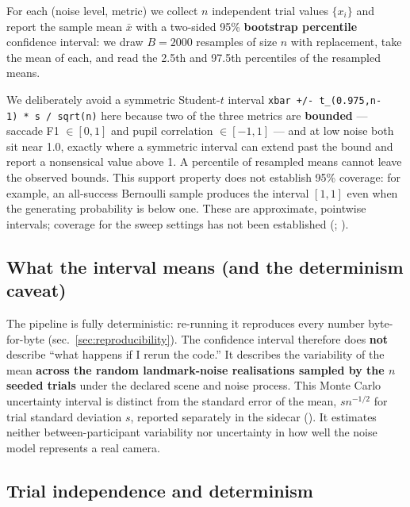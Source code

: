 \documentclass[
]{article}
\begin{document}
For each (noise level, metric) we collect \(n\) independent trial values
\(\{x_i\}\) and report the sample mean \(\bar{x}\) with a two-sided 95\%
\textbf{bootstrap percentile} confidence interval: we draw \(B = 2000\)
resamples of size \(n\) with replacement, take the mean of each, and
read the 2.5th and 97.5th percentiles of the resampled means.

We deliberately avoid a symmetric Student-\(t\) interval
\texttt{xbar\ +/-\ t\_(0.975,n-1)\ *\ s\ /\ sqrt(n)} here because two of
the three metrics are \textbf{bounded} --- saccade F1 \(\in [0,1]\) and
pupil correlation \(\in [-1,1]\) --- and at low noise both sit near 1.0,
exactly where a symmetric interval can extend past the bound and report
a nonsensical value above 1. A percentile of resampled means cannot
leave the observed bounds. This support property does not establish 95\%
coverage: for example, an all-success Bernoulli sample produces the
interval \([1,1]\) even when the generating probability is below one.
These are approximate, pointwise intervals; coverage for the sweep
settings has not been established (; ).

\subsection{What the interval means (and the determinism
caveat)}\label{what-the-interval-means-and-the-determinism-caveat}

The pipeline is fully deterministic: re-running it reproduces every
number byte-for-byte (sec.~\ref{sec:reproducibility}). The confidence
interval therefore does \textbf{not} describe ``what happens if I rerun
the code.'' It describes the variability of the mean \textbf{across the
random landmark-noise realisations sampled by the \(n\) seeded trials}
under the declared scene and noise process. This Monte Carlo uncertainty
interval is distinct from the standard error of the mean, \(s n^{-1/2}\)
for trial standard deviation \(s\), reported separately in the sidecar
(). It estimates
neither between-participant variability nor uncertainty in how well the
noise model represents a real camera.

\subsection{Trial independence and
determinism}\label{trial-independence-and-determinism}
\end{document}
